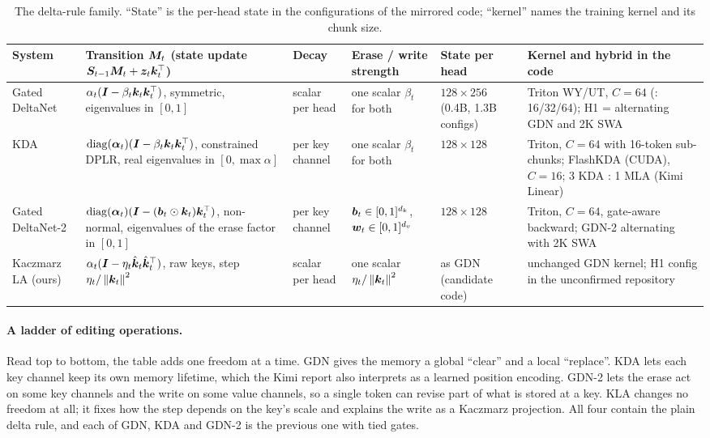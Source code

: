 \begin{table}[t]
\centering\small
\caption{The delta-rule family. ``State'' is the per-head state in the configurations of the
mirrored code; ``kernel'' names the training kernel and its chunk size.}
\label{tab:c05-compare}
\begin{tabularx}{\textwidth}{@{}>{\raggedright\arraybackslash}p{1.7cm}>{\raggedright\arraybackslash}X>{\raggedright\arraybackslash}p{1.5cm}>{\raggedright\arraybackslash}p{2.1cm}>{\raggedright\arraybackslash}p{1.6cm}>{\raggedright\arraybackslash}X@{}}
\toprule
System & Transition $\bm{M}_t$ (state update $\bm{S}_{t-1}\bm{M}_t + \bm{z}_t\bm{k}_t^{\top}$) & Decay & Erase / write strength & State per head & Kernel and hybrid in the code \\
\midrule
Gated DeltaNet & $\alpha_t(\bm{I} - \beta_t\bm{k}_t\bm{k}_t^{\top})$, symmetric, eigenvalues in $[0,1]$ & scalar per head & one scalar $\beta_t$ for both & $128\times256$ (0.4B, 1.3B configs) & Triton WY/UT, $C = 64$ (\fla{}: 16/32/64); H1 = alternating GDN and 2K SWA \\
KDA & $\operatorname{diag}(\bm{\alpha}_t)(\bm{I} - \beta_t\bm{k}_t\bm{k}_t^{\top})$, constrained DPLR, real eigenvalues in $[0,\max\alpha]$ & per key channel & one scalar $\beta_t$ for both & $128\times128$ & Triton, $C = 64$ with 16-token sub-chunks; FlashKDA (CUDA), $C = 16$; 3 KDA : 1 MLA (Kimi Linear) \\
Gated DeltaNet-2 & $\operatorname{diag}(\bm{\alpha}_t)(\bm{I} - (\bm{b}_t\odot\bm{k}_t)\bm{k}_t^{\top})$, non-normal, eigenvalues of the erase factor in $[0,1]$ & per key channel & $\bm{b}_t \in [0,1]^{d_k}$, $\bm{w}_t \in [0,1]^{d_v}$ & $128\times128$ & Triton, $C = 64$, gate-aware backward; GDN-2 alternating with 2K SWA \\
Kaczmarz LA (ours) & $\alpha_t(\bm{I} - \eta_t\hat{\bm{k}}_t\hat{\bm{k}}_t^{\top})$, raw keys, step $\eta_t/\left\lVert \bm{k}_t\right\rVert^2$ & scalar per head & one scalar $\eta_t/\left\lVert \bm{k}_t\right\rVert^2$ & as GDN (candidate code) & unchanged GDN kernel; H1 config in the unconfirmed repository \\
\bottomrule
\end{tabularx}
\end{table}

\paragraph{A ladder of editing operations.} Read top to bottom, the table adds one freedom at a
time. GDN gives the memory a global ``clear'' and a local ``replace''. KDA lets each key channel
keep its own memory lifetime, which the Kimi report also interprets as a learned position
encoding. GDN-2 lets the erase act on some key channels and the write on some value channels, so a
single token can revise part of what is stored at a key. KLA changes no freedom at all; it fixes
how the step depends on the key's scale and explains the write as a Kaczmarz projection. All four
contain the plain delta rule, and each of GDN, KDA and GDN-2 is the previous one with tied gates.

